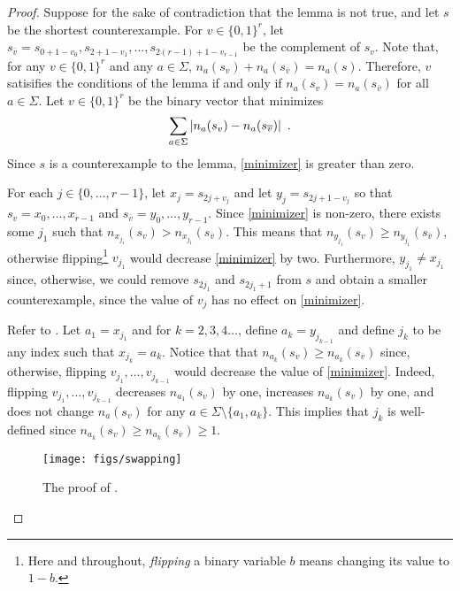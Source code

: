 \documentclass{patmorin}
\begin{document}
\begin{proof}
  Suppose for the sake of contradiction that the lemma is not true, and
  let $s$ be the shortest counterexample.  For $v\in\{0,1\}^{r}$, let
  $s_{\overline{v}}=s_{0+1-v_0},s_{2+1-v_1},\ldots,s_{2(r-1)+1-v_{r-1}}$
  be the complement of $s_v$.  Note that, for any $v\in\{0,1\}^{r}$
  and any $a\in\Sigma$, $n_a(s_v)+n_a(s_{\overline{v}})=n_a(s)$.
  Therefore, $v$ satisifies the conditions of the lemma if and
  only if $n_a(s_v)=n_a(s_{\overline{v}})$ for all $a\in\Sigma$.
  Let $v\in\{0,1\}^{r}$ be the binary vector that minimizes
  \begin{equation}\eqlabel{minimizer}
     \sum_{a\in\Sigma}|n_a(s_v)-n_a(s_{\overline{v}})| \enspace .
  \end{equation}
  Since $s$ is a counterexample to the lemma, \eqref{minimizer} is
  greater than zero.

  For each $j\in\{0,\ldots,r-1\}$, let $x_{j}=s_{2j+v_j}$ and
  let $y_j=s_{2j+1-v_j}$ so that $s_v=x_0,\ldots,x_{r-1}$ and
  $s_{\overline{v}}=y_0,\ldots,y_{r-1}$.  Since \eqref{minimizer}
  is non-zero, there exists some $j_1$ such that $n_{x_{j_1}}(s_v) >
  n_{x_{j_1}}(s_{\overline{v}})$.  This means that $n_{y_{j_1}}(s_v) \ge
  n_{y_{j_1}}(s_{\overline{v}})$, otherwise flipping\footnote{Here and
  throughout, \emph{flipping} a binary variable $b$ means changing its value to $1-b$.}
  $v_{j_1}$ would decrease \eqref{minimizer} by two.  Furthermore,
  $y_{j_1}\neq x_{j_1}$ since, otherwise, we could remove $s_{2j_1}$
  and $s_{2j_1+1}$ from $s$ and obtain a smaller counterexample, since
  the value of $v_j$ has no effect on \eqref{minimizer}.

  Refer to .
  Let $a_1=x_{j_1}$ and for $k=2,3,4\ldots$, define $a_k = y_{j_{k-1}}$
  and define $j_k$ to be any index such that $x_{j_k}=a_k$.  Notice that
  that $n_{a_k}(s_v)\ge n_{a_{k}}(s_{\overline{v}})$ since, otherwise,
  flipping $v_{j_1},\ldots,v_{j_{k-1}}$ would decrease the value of
  \eqref{minimizer}.  Indeed, flipping $v_{j_1},\ldots,v_{j_{k-1}}$
  decreases $n_{a_1}(s_v)$ by one, increases $n_{a_k}(s_v)$ by one, and
  does not change $n_a(s_v)$ for any $a\in\Sigma \setminus \{a_1,a_k\}$.
  This implies that $j_{k}$ is well-defined since
  $n_{a_k}(s_v)\ge n_{a_k}(s_{\overline{v}})\ge 1$.

  \begin{figure}
    \begin{center}
       \texttt{[image: figs/swapping]}
    \end{center}
    \caption{The proof of .}
  \end{figure}


\end{proof}
\end{document}
